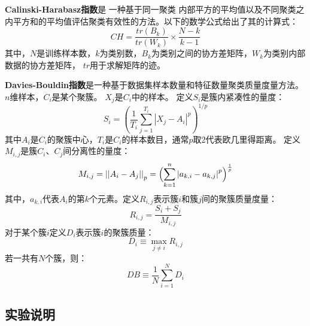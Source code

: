 \documentclass{acm_proc_article-sp}
\begin{document}
\textbf{Calinski-Harabasz指数}是%
一种基于同一聚类
内部平方的平均值以及不同聚类之内平方和的平均值评估聚类有效性的方法。以下的数学公式给出了其的计算式：
$$\mathit{CH} = \frac{ tr(B_k) }{ tr(W_k) } \times \frac{ N-k }{ k-1 }$$
其中，$N$是训练样本数，$k$为类别数，$B_k$为类别之间的协方差矩阵，$W_k$为类别内部数据的协方差矩阵，
$tr$用于求解矩阵的迹。

\textbf{Davies-Bouldin指数}是一种基于数据集样本数量和特征数量聚类质量度量方法。
$n$维样本，$C_i$是某个聚簇。 $X_j$是$C_i$中的样本。 定义$S_i$是簇内紧凑性的量度：
$$S_i = \left(\frac{1}{T_i} \sum_{j=1}^{T_i} {\left| X_j-A_i\right|^p}\right)^{1/p}$$
其中$A_i$是$C_i$的聚簇中心，$T_i$是$C_i$的样本数目，通常$p$取2代表欧几里得距离。
定义$M_{i,j}$是簇$C_i$、$C_j$间分离性的量度：
$$M_{i,j} = \left|\left|A_i-A_j\right|\right|_p = \Bigl(\displaystyle\sum_{k=1}^{n}\left|a_{k,i}-a_{k,j}\right|^p\Bigr)^{\frac 1 p}$$
其中，$a_{k,i}$代表$A_i$的第$k$个元素。定义$R_{i,j}$表示簇$i$和簇$j$间的聚簇质量度量：
$$R_{i,j} = \frac{S_i + S_j}{M_{i,j}}$$
对于某个簇$i$定义$D_i$表示簇$i$的聚簇质量：
$$D_i \equiv \max_{j \neq i} R_{i,j}$$
若一共有$N$个簇，则：
$$\mathit{DB} \equiv \frac{1}{N}\displaystyle\sum_{i=1}^N D_i$$

\subsection{\textsf{实验说明}}
\end{document}
